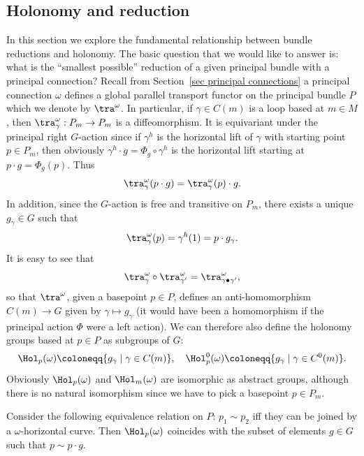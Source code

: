 \subsection{Holonomy and reduction}\label{sec holonomy}

In this section we explore the fundamental relationship between bundle reductions and holonomy. The basic question that we would like to answer is: what is the ``smallest possible'' reduction of a given principal bundle with a principal connection? Recall from Section~\ref{sec principal connections} a principal connection $\omega$ defines a global parallel transport functor on the principal bundle $P$ which we denote by $\tra^\omega$. In particular, if $\gamma\in C(m)$ is a loop based at $m\in M$, then $\tra^\omega_\gamma:P_m\to P_m$ is a diffeomorphism. It is equivariant under the principal right $G$-action since if $\gamma^h$ is the horizontal lift of $\gamma$ with starting point $p\in P_m$, then obviously $\gamma^h\cdot g=\Phi_g\circ\gamma^h$ is the horizontal lift starting at $p\cdot g=\Phi_g(p)$. Thus
\[\tra_\gamma^\omega(p\cdot g)=\tra_\gamma^\omega(p)\cdot g.\label{eq 1.7.4 RS2}\]
In addition, since the $G$-action is free and transitive on $P_m$, there exists a unique $g_\gamma\in G$ such that
\[\tra_\gamma^\omega(p)=\gamma^h(1)=p\cdot g_\gamma.\label{eq 1.7.5 RS2}\]
It is easy to see that
\[\tra_{\gamma}^\omega\circ\tra_{\gamma'}^\omega=\tra_{\gamma\bullet\gamma'}^\omega,\]
so that $\tra^\omega$, given a basepoint $p\in P$, defines an anti-homomorphism $C(m)\to G$ given by $\gamma\mapsto g_\gamma$ (it would have been a homomorphism if the principal action $\Phi$ were a left action). We can therefore also define the holonomy groups based at $p\in P$ as subgroups of $G$:
\[\Hol_p(\omega)\coloneqq \{g_\gamma \mid \gamma\in C(m)\}, \quad \Hol_p^0(\omega)\coloneqq\{g_\gamma \mid \gamma\in C^0(m)\}.\]
Obviously $\Hol_p(\omega)$ and $\Hol_m(\omega)$ are isomorphic as abstract groups, although there is no natural isomorphism since we have to pick a basepoint $p\in P_m$.

\begin{rem}\label{rem 1.7.7 RS2}
    Consider the following equivalence relation on $P$: $p_1\sim p_2$ iff they can be joined by a $\omega$-horizontal curve. Then $\Hol_p(\omega)$ coincides with the subset of elements $g\in G$ such that $p\sim p\cdot g$.
\end{rem}

